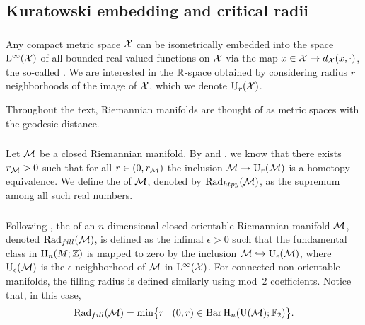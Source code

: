

\subsection{Kuratowski embedding and critical radii}\label{sub:filling radii}

\subsubsection{}

Any compact metric space $\cX$ can be isometrically embedded into the space $\rL^\infty(\cX)$ of all bounded real-valued functions on $\cX$ via the map $x \in \cX \mapsto d_\cX(x,\cdot)$, the so-called .
We are interested in the \(\R\)-space obtained by considering radius \(r\) neighborhoods of the image of \(\cX\), which we denote \(\rU_r(\cX)\).

Throughout the text, Riemannian manifolds are thought of as metric spaces with the geodesic distance.

\subsubsection{}\label{ss:first_critical_value}

Let \(\cM\) be a closed Riemannian manifold.
By \cite[Thm.~3.5]{hausmann1995vietoris} and \cite[Thm.~4.1]{lim2020vietoris}, we know that there exists \(r_\cM > 0\) such that for all \(r \in (0,r_\cM)\) the inclusion \(\cM \to \rU_r(\cM)\) is a homotopy equivalence.
We define the  of \(\cM\), denoted by \(\Rad_{htpy}(\cM)\), as the supremum among all such real numbers.


\subsubsection{}

Following \cite{gromov1983filling}, the  of an \(n\)-dimensional closed orientable Riemannian manifold $\cM$, denoted \(\Rad_{fill}(\cM)\), is defined as the infimal $\epsilon > 0$ such that the fundamental class in $\rH_n(M; \Z)$ is mapped to zero by the inclusion $\cM \hookrightarrow \rU_\epsilon(\cM)$, where \(\rU_\epsilon(\cM)\) is the \(\epsilon\)-neighborhood of \(\cM\) in \(\rL^\infty(\cX)\).
For connected non-orientable manifolds, the filling radius is defined similarly using mod~2 coefficients.
Notice that, in this case,
\[
\Rad_{fill}(\cM) = \min\set[\big]{r \mid (0, r) \in \barc \rH_n(\rU(\cM); \Ftwo)}.
\]

